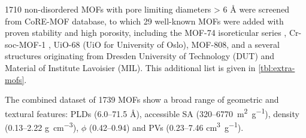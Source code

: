 1710 non-disordered MOFs with pore limiting diameters \textgreater{} 6 Å were
screened from CoRE-MOF database, to which 29 well-known MOFs were added with
proven stability and high porosity, including the MOF-74 isoreticular series
\citep{gulcayBiocompatibleMOFsStorage2019}, Cr-soc-MOF-1
\citep{nandiRevisitingWaterSorption2019}, UiO-68 (UiO for University of Oslo),
MOF-808, \citep{soaresComputationalEvaluationChemical2019} and a several
structures originating from Dresden University of Technology (DUT) and Material
of Institute Lavoisier (MIL). This additional list is given in \cref{tbl:extra-mofs}.

The combined dataset of 1739 MOFs show a broad range of geometric and textural
features: PLDs (6.0--71.5 Å),  accessible SA
(320--\SI{6770}{\metre\squared\per\gram}), density (0.13--2.22
\si{\gram\per\centi\metre\cubed}), \(\phi\) (0.42--0.94) and PVs (0.23--7.46
\si{\centi\metre\cubed\per\gram}).

